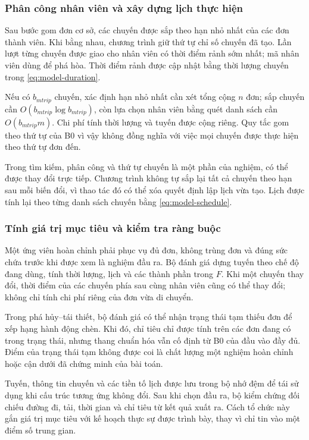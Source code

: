 \subsubsection{Phân công nhân viên và xây dựng lịch thực hiện}
Sau bước gom đơn cơ sở, các chuyến được sắp theo hạn nhỏ nhất của các đơn thành viên. Khi bằng nhau, chương trình giữ thứ tự chỉ số chuyến đã tạo. Lần lượt từng chuyến được giao cho nhân viên có thời điểm rảnh sớm nhất; mã nhân viên dùng để phá hòa. Thời điểm rảnh được cập nhật bằng thời lượng chuyến trong \eqref{eq:model-duration}.

Nếu có $b_{
m trip}$ chuyến, xác định hạn nhỏ nhất cần xét tổng cộng $n$ đơn; sắp chuyến cần $O(b_{
m trip}\log b_{
m trip})$, còn lựa chọn nhân viên bằng quét danh sách cần $O(b_{
m trip}m)$. Chi phí tính thời lượng và tuyến được cộng riêng. Quy tắc gom theo thứ tự của B0 vì vậy không đồng nghĩa với việc mọi chuyến được thực hiện theo thứ tự đơn đến.

Trong tìm kiếm, phân công và thứ tự chuyến là một phần của nghiệm, có thể được thay đổi trực tiếp. Chương trình không tự sắp lại tất cả chuyến theo hạn sau mỗi biến đổi, vì thao tác đó có thể xóa quyết định lập lịch vừa tạo. Lịch được tính lại theo từng danh sách chuyến bằng \eqref{eq:model-schedule}.

\subsubsection{Tính giá trị mục tiêu và kiểm tra ràng buộc}
Một ứng viên hoàn chỉnh phải phục vụ đủ đơn, không trùng đơn và đúng sức chứa trước khi được xem là nghiệm đầu ra. Bộ đánh giá dựng tuyến theo chế độ đang dùng, tính thời lượng, lịch và các thành phần trong $F$. Khi một chuyến thay đổi, thời điểm của các chuyến phía sau cùng nhân viên cũng có thể thay đổi; không chỉ tính chi phí riêng của đơn vừa di chuyển.

Trong phá hủy--tái thiết, bộ đánh giá có thể nhận trạng thái tạm thiếu đơn để xếp hạng hành động chèn. Khi đó, chỉ tiêu chỉ được tính trên các đơn đang có trong trạng thái, nhưng thang chuẩn hóa vẫn cố định từ B0 của đầu vào đầy đủ. Điểm của trạng thái tạm không được coi là chất lượng một nghiệm hoàn chỉnh hoặc cận dưới đã chứng minh của bài toán.

Tuyến, thông tin chuyến và các tiền tố lịch được lưu trong bộ nhớ đệm để tái sử dụng khi cấu trúc tương ứng không đổi. Sau khi chọn đầu ra, bộ kiểm chứng đối chiếu đường đi, tải, thời gian và chỉ tiêu từ kết quả xuất ra. Cách tổ chức này gắn giá trị mục tiêu với kế hoạch thực sự được trình bày, thay vì chỉ tin vào một điểm số trung gian.

